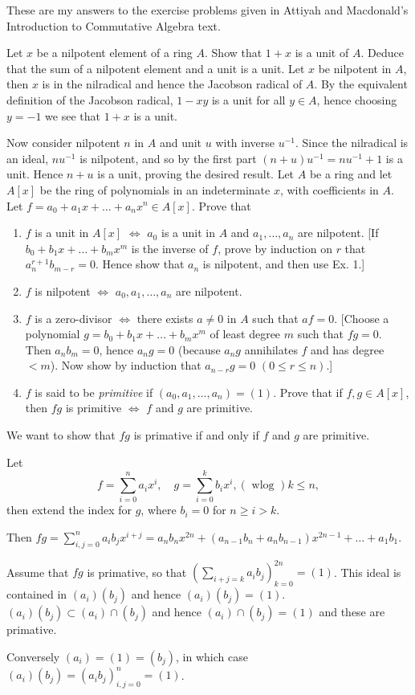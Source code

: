 \documentclass[a4paper]{article}
\begin{document}
\maketitle
These are my answers to the exercise problems given in Attiyah and Macdonald's Introduction to Commutative Algebra text.
\begin{qanda}
  \question
    Let $x$ be a nilpotent element of a ring $A$. Show that $1+x$ is a unit of $A$. Deduce that the sum of a nilpotent element and a unit is a unit.
  \answer
    Let $x$ be nilpotent in $A$, then $x$ is in the nilradical and hence the Jacobson radical of $A$. By the equivalent definition of the Jacobson radical, $1-xy$ is a unit for all $y\in A$, hence choosing $y = -1$ we see that $1+x$ is a unit.
    
    Now consider nilpotent $n$ in $A$ and unit $u$ with inverse $u^{-1}$. Since the nilradical is an ideal, $nu^{-1}$ is nilpotent, and so by the first part $(n+u)u^{-1} = nu^{-1} + 1$ is a unit. Hence $n+u$ is a unit, proving the desired result.
  \question
    Let $A$ be a ring and let $A[x]$ be the ring of polynomials in an indeterminate $x$, with coefficients in $A$. Let $f = a_0 + a_1 x + \dots + a_n x^n\in A[x]$. Prove that
    \begin{enumerate}
        \item $f$ is a unit in $A[x]$ $\iff$ $a_0$ is a unit in $A$ and $a_1, \dots, a_n$ are nilpotent. [If $b_0 + b_1x + \dots + b_m x^m$ is the inverse of $f$, prove by induction on $r$ that $a_n^{r+1}b_{m-r} = 0$. Hence show that $a_n$ is nilpotent, and then use Ex. 1.]
        \item $f$ is nilpotent $\iff$ $a_0, a_1, \dots, a_n$ are nilpotent.
        \item $f$ is a zero-divisor $\iff$ there exists $a\neq 0$ in $A$ such that $af = 0$. [Choose a polynomial $g = b_0 + b_1 x + \dots + b_m x^m$ of least degree $m$ such that $fg = 0$. Then $a_n b_m = 0$, hence $a_n g = 0$ (because $a_ng$ annihilates $f$ and has degree $< m$). Now show by induction that $a_{n-r} g = 0$ $(0 \leq r \leq n)$.]
        \item $f$ is said to be \emph{primitive} if $(a_0,a_1, \dots, a_n) = (1)$. Prove that if $f,g \in A[x]$, then $fg$ is primitive $\iff$ $f$ and $g$ are primitive.
    \end{enumerate}
  \answer
\end{qanda}

We want to show that $fg$ is primative if and only if $f$ and $g$ are primitive.

Let $$f=\sum_{i=0}^n a_ix^i,\quad g=\sum_{i=0}^k b_ix^i, (\text{ wlog }) k\leq n,$$
then extend the index for $g$, where $b_i=0$ for $n\geq i>k$.

Then $fg=\sum_{i,j=0}^n a_ib_jx^{i+j} = a_nb_n x^{2n} + (a_{n-1}b_n + a_nb_{n-1}) x^{2n-1} + \dots + a_1b_1$.

Assume that $fg$ is primative, so that $(\sum_{i+j=k}a_ib_j)_{k=0}^{2n}=(1)$. This ideal is contained in $(a_i)(b_j)$ and hence $(a_i)(b_j)=(1)$. $(a_i)(b_j)\subset (a_i)\cap (b_j)$ and hence $(a_i)\cap (b_j)=(1)$ and these are primative.

Conversely $(a_i)=(1)=(b_j)$, in which case $(a_i)(b_j)=(a_ib_j)_{i,j=0}^n=(1)$.
\end{document}
